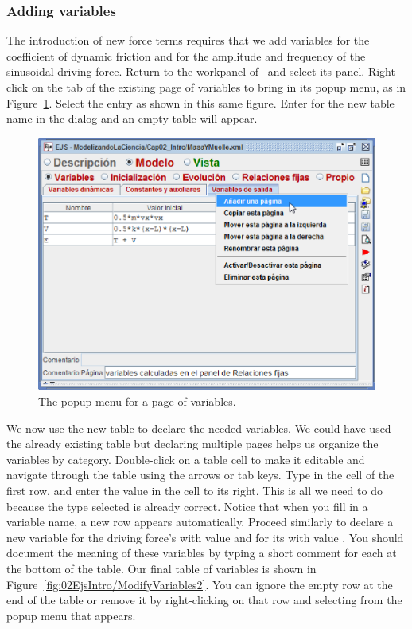 \subsubsection{Adding variables}

The introduction of new force terms requires that we add variables for the coefficient of dynamic friction and for the amplitude and frequency of the sinusoidal driving force.  Return to the  workpanel of \ejs\ and select its  panel. Right-click on the tab of the existing page of variables to bring in its popup menu, as in Figure~\ref{fig:02EjsIntro/ModifyVariables1}.
Select the  entry as shown in this same figure. Enter  for the new table name in the dialog and an empty table will appear.

\begin{figure}[htb]
    \centering
  \includegraphics[scale=\scale]{02EjsIntro/images/ModifyVariables1.eps}
    \caption{The popup menu for a page of variables. }
    \label{fig:02EjsIntro/ModifyVariables1}
\end{figure}

We now use the new table to declare the needed variables. We could have used the already existing table but declaring multiple pages helps us organize the variables by category. Double-click on a table cell to make it editable and navigate through the table using the arrows or tab keys. Type  in the  cell of the first row, and enter the value  in the  cell to its right. This is all we need to do because the  type selected is already correct. Notice that when you fill in a variable name, a new row appears automatically. Proceed similarly to declare a new variable for the driving force's  with value  and for its  with value . You should document the meaning of these variables by typing a short comment for each at the bottom of the table. Our final table of variables is shown in Figure~\ref{fig:02EjsIntro/ModifyVariables2}.  You can ignore the empty row at the end of the table or remove it by right-clicking on that row and selecting  from the popup menu that appears.


